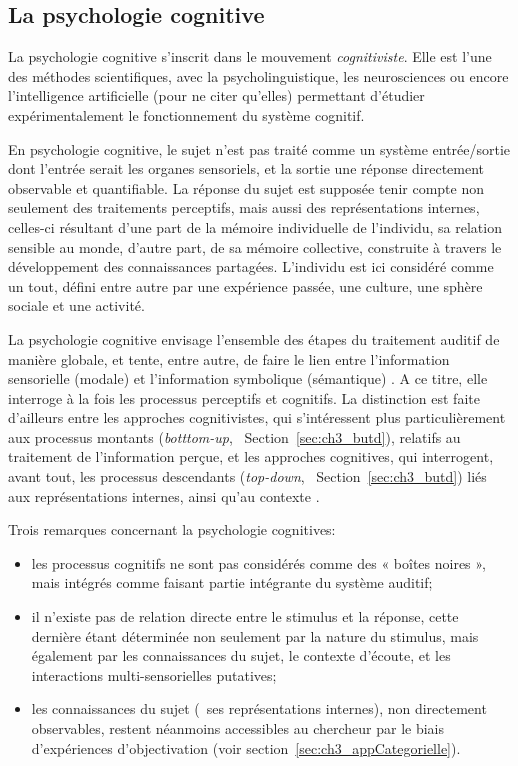 \subsection{La psychologie cognitive}
\label{sec:ch3_psychoCogDef}

La psychologie cognitive s'inscrit dans le mouvement \emph{cognitiviste}. Elle est l'une des méthodes scientifiques, avec la psycholinguistique, les neurosciences ou encore l'intelligence artificielle (pour ne citer qu'elles) permettant d'étudier expérimentalement le fonctionnement du système cognitif.

En psychologie cognitive, le sujet n'est pas traité comme un système entrée/sortie dont l'entrée serait les organes sensoriels, et la sortie une réponse directement observable et quantifiable. La réponse du sujet est supposée tenir compte non seulement des traitements perceptifs, mais aussi des représentations internes, celles-ci résultant d'une part de la mémoire individuelle de l'individu, sa relation sensible au monde, d'autre part, de sa mémoire collective, construite à travers le développement des connaissances partagées. L'individu est ici considéré comme un tout, défini entre autre par une expérience passée, une culture, une sphère sociale et une activité.

La psychologie cognitive envisage l'ensemble des étapes du traitement auditif de manière globale, et tente, entre autre, de faire le lien entre l'information sensorielle (modale) et l'information symbolique (sémantique) \citep{mcadams1994penser}. A ce titre, elle interroge à la fois les processus perceptifs et cognitifs. La distinction est faite d'ailleurs entre les approches cognitivistes, qui s'intéressent plus particulièrement aux processus montants (\emph{botttom-up}, \cf~Section~\ref{sec:ch3_butd}), relatifs au traitement de l'information perçue, et les approches cognitives, qui interrogent, avant tout, les processus descendants (\emph{top-down}, \cf~Section~\ref{sec:ch3_butd}) liés aux représentations internes, ainsi qu'au contexte \citep[p. 34]{guastavino_etude_2003}. 

Trois remarques concernant la psychologie cognitives:

\begin{itemize}
\item les processus cognitifs ne sont pas considérés comme des « boîtes noires », mais intégrés comme faisant partie intégrante du système auditif;
\item il n'existe pas de relation directe entre le stimulus et la réponse, cette dernière étant déterminée non seulement par la nature du stimulus, mais également par les connaissances du sujet, le contexte d'écoute, et les interactions multi-sensorielles putatives;
\item les connaissances du sujet (\ie~ses représentations internes), non directement observables, restent néanmoins accessibles au chercheur par le biais d'expériences d'objectivation (voir section~\ref{sec:ch3_appCategorielle}).
\end{itemize}

